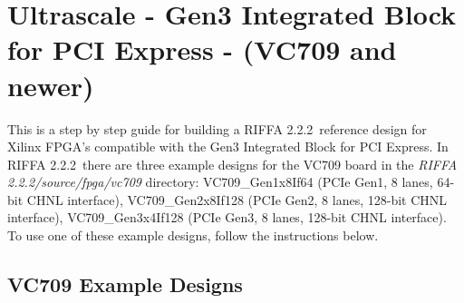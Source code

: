 \documentclass{refrep}
\newcommand{\RIFFAVer}{2.2.2}
\newcommand{\Directory}[1]{\textit{#1}}
\newcommand{\VCSevenOhNineExampleDesignsLong}{VC709\_Gen1x8If64 (PCIe Gen1, 8 lanes, 64-bit CHNL interface), VC709\_Gen2x8If128 (PCIe Gen2, 8 lanes, 128-bit CHNL interface), VC709\_Gen3x4If128 (PCIe Gen3, 8 lanes, 128-bit CHNL interface)}
\begin{document}
\pagebreak
\section{Ultrascale - Gen3 Integrated Block for PCI Express - (VC709 and newer)}
This is a step by step guide for building a RIFFA \RIFFAVer~reference design for
Xilinx FPGA's compatible with the Gen3 Integrated Block for PCI Express. In
RIFFA \RIFFAVer~there are three example designs for the VC709 board in the
\Directory{RIFFA \RIFFAVer/source/fpga/vc709} directory:
\VCSevenOhNineExampleDesignsLong. To use one of these example designs, follow
the instructions below.

\subsection{VC709 Example Designs}
\label{Sec:Gen3Integrated:ExampleDesign}
\end{document}
